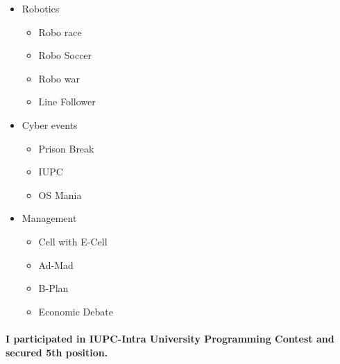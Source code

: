 \documentclass{report}
\begin{document}
\begin{itemize}
\item Robotics
\begin{itemize}
\item Robo race

\item Robo Soccer

\item Robo war
\item Line Follower
\end{itemize}
\item Cyber events
\begin{itemize}
\item Prison Break
\item IUPC

\item OS Mania
\end{itemize}
\item Management
\begin{itemize}
\item Cell with E-Cell
\item Ad-Mad
\item B-Plan
\item Economic Debate
\end{itemize}
\end{itemize} 
\paragraph{\LARGE{I participated in IUPC-Intra University Programming Contest and secured 5th position.}}
\end{document}
